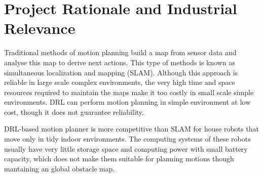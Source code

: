\section{Project Rationale and Industrial Relevance}

Traditional methods of motion planning build a map from sensor data and analyse this map to derive next actions. This type of methods is known as simultaneous localization and mapping (SLAM). Although this approach is reliable in large scale complex environments, the very high time and space resources required to maintain the maps make it too costly in small scale simple environments. DRL can perform motion planning in simple environment at low cost, though it does not guarantee reliability.

DRL-based motion planner is more competitive than SLAM for house robots that move only in tidy indoor environments. The computing systems of these robots usually have very little storage space and computing power with small battery capacity, which does not make them suitable for planning motions though mantaining an global obstacle map.

